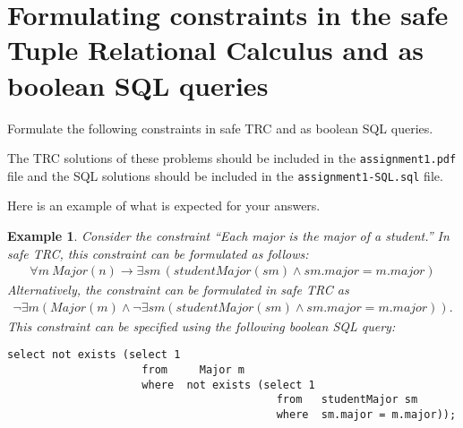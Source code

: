 \documentclass{article}
\newtheorem{example}{Example}
\begin{document}
\section{Formulating constraints in the safe Tuple Relational Calculus and as boolean SQL queries}
Formulate the following constraints in safe TRC and as boolean SQL queries.    

The TRC solutions of these problems should be included in the {\tt assignment1.pdf} file and
the SQL solutions should be included in the {\tt assignment1-SQL.sql} file.

Here is an example of what is expected for your answers.

\begin{example}
Consider the constraint ``\emph{Each major is the major of a student.}''
In safe TRC, this constraint can be formulated as follows:
$$
\begin{array}{l}
\forall m\ Major(n) \rightarrow \exists sm\, (studentMajor(sm) \land sm.major = m.major)
\end{array}
$$
Alternatively, the constraint can be formulated in safe TRC as
$$
\begin{array}{l}
\lnot \exists m (Major(m) \land \lnot \exists sm (studentMajor(sm) \land sm.major = m.major)).
\end{array}
$$
This constraint can be specified using the following boolean SQL query:
\begin{verbatim}
select not exists (select 1
      	      	     from	  Major	m
      	      	     where  not exists (select 1
      	      	      	      	          from   studentMajor sm
      	      	      	      	          where  sm.major = m.major));
\end{verbatim}

\end{example}
\end{document}
